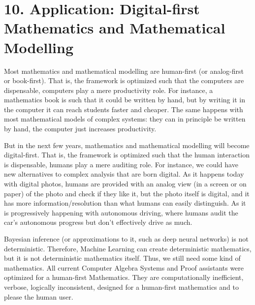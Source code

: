 \documentclass[11pt]{book}
\begin{document}
\hypertarget{application-digital-first-mathematics-and-mathematical-modelling}{%
\section{10. Application: Digital-first Mathematics and Mathematical
Modelling}\label{application-digital-first-mathematics-and-mathematical-modelling}}

Most mathematics and mathematical modelling are human-first (or
analog-first or book-first). That is, the framework is optimized such
that the computers are dispensable, computers play a mere productivity
role. For instance, a mathematics book is such that it could be written
by hand, but by writing it in the computer it can reach students faster
and cheaper. The same happens with most mathematical models of complex
systems: they can in principle be written by hand, the computer just
increases productivity.

But in the next few years, mathematics and mathematical modelling will
become digital-first. That is, the framework is optimized such that the
human interaction is dispensable, humans play a mere auditing role. For
instance, we could have new alternatives to complex analysis that are
born digital. As it happens today with digital photos, humans are
provided with an analog view (in a screen or on paper) of the photo and
check if they like it, but the photo itself is digital, and it has more
information/resolution than what humans can easily distinguish. As it is
progressively happening with autonomous driving, where humans audit the
car's autonomous progress but don't effectively drive as much.

Bayesian inference (or approximations to it, such as deep neural
networks) is not deterministic. Therefore, Machine Learning can create
deterministic mathematics, but it is not deterministic mathematics
itself. Thus, we still need some kind of mathematics. All current
Computer Algebra Systems and Proof assistants were optimized for a
human-first Mathematics. They are computationally inefficient, verbose,
logically inconsistent, designed for a human-first mathematics and to
please the human user.
\end{document}
